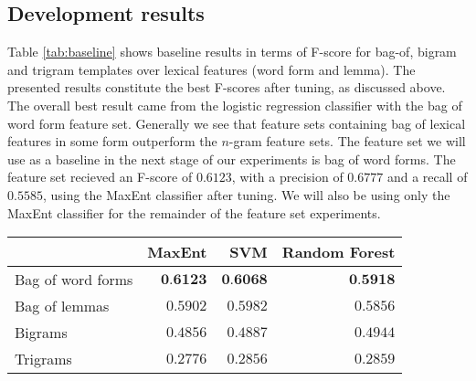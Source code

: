 \documentclass[11pt,letterpaper]{article}
\begin{document}
\subsection{Development results}
Table \ref{tab:baseline} shows baseline results in terms of F-score
for bag-of, bigram and trigram templates over lexical features (word
form and lemma). The presented results constitute the best F-scores
after tuning, as discussed above. The
overall best result came from the logistic regression classifier with
the bag of word form feature set. Generally we see that feature sets
containing bag of lexical features in some form outperform the
$n$-gram feature sets.
The feature set we will use as a baseline in the next stage of our
experiments is bag of word forms. The feature set recieved an F-score
of $0.6123$, with a precision of $0.6777$ and a recall of $0.5585$,
using the MaxEnt classifier after tuning. We will also be
using only the MaxEnt classifier for the remainder of the
feature set experiments.
\begin{table*}
  \begin{center}
    \begin{tabular}{lrrr}
      \toprule

      & MaxEnt & SVM & Random Forest \\
      \midrule
      Bag of word forms & $\textbf{0.6123}$ & $\textbf{0.6068}$ & $\textbf{0.5918}$ \\ %
      Bag of lemmas & $0.5902$ & $0.5982$ & $0.5856$ \\
      Bigrams & $0.4856$ & $0.4887$ & $0.4944$ \\
      Trigrams & $0.2776$ & $0.2856$ & $0.2859$ \\
      
      
      \bottomrule
    \end{tabular}
  \end{center}
  \caption{Results for baseline system; F-score for bag-of, bigram and trigram templates over lexical features (word form and lemma).}
  \label{tab:baseline}
\end{table*}
\end{document}
